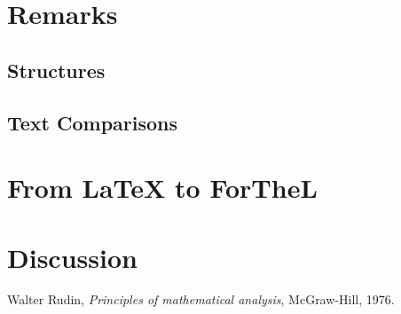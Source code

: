 \documentclass{article}
\begin{document}
\section{Remarks}
\subsection{Structures}


\subsection{Text Comparisons}



\section{{From \LaTeX} to ForTheL}



\section{Discussion}


\begin{thebibliography}{1}

  Walter Rudin,
  \textit{Principles of mathematical analysis},
  McGraw-Hill,
  1976.

\end{thebibliography}
  
\end{document}
